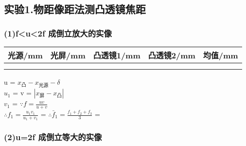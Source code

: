 \subsection*{实验1.物距像距法测凸透镜焦距}
\subsubsection*{(1)f<u<2f 成倒立放大的实像}

\begin{center}

\begin{tabular}{|c|c|c|c|c|}
\hline 
光源/mm & 光屏/mm & 凸透镜1/mm & 凸透镜2/mm & 均值/mm \\ 
\hline 
{%
{%
{%
{%
	& %
{%
{%
\\
\hline
{%
\end{tabular}
\vspace{10pt}

\end{center}
u = ${x}_{\text{凸}} - {x}_{\text{光源}} - {\delta}$\\
${u}_1$ = %
v = $\left | {x}_{\text{屏}} - {x}_{\text{凸}} \right |$\\
${v}_1$ = %
$\because f = \frac{uv}{u+v}$\\
$\therefore {f}_1 = \frac{{u}_1{v}_1}{{u}_1+{v}_1}$ = %
$\therefore {\bar{f}}_1 = \frac{{f}_1+{f}_2+{f}_3}{3}$ = %

\subsubsection*{(2)u=2f 成倒立等大的实像}

